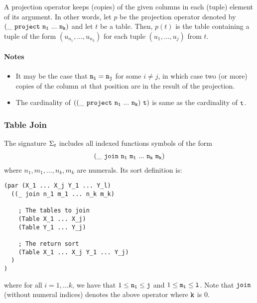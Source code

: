 \documentclass[english,a4paper,10pt]{article}
\begin{document}
A projection operator keeps (copies) of the given columns
in each (tuple) element of its argument.
In other words,
let $p$ be the projection operator denoted by ${\tt (\_\ project\ n_1\ ...\ n_k)}$
and let $t$ be a table.
Then, $p(t)$
is the table containing a tuple of the form
$(u_{n_1}, \ldots, u_{n_k})$
for each tuple $(u_1, \ldots, u_j)$ from $t$.

\paragraph{Notes}
\begin{itemize}
\item
It may be the case that ${\tt n_i} = {\tt n_j}$ for some $i \neq j$,
in which case two (or more) copies of the column at that position
are in the result of the projection.
\item
The cardinality of $\syntax{((\_\ project\ n_1\ ...\ n_k)\ t)}$ is
same as the cardinality of ${\tt t}$.
\end{itemize}

\subsubsection{Table Join}
The signature $\Sigma_{t}$ includes 
all indexed functions symbols of the form
\begin{align*}
{\tt  
(\_\ join\ n_1\ m_1\ ...\ n_k\ m_k)
}
\end{align*}
where $n_1, m_1, \ldots, n_k, m_k$ are numerals.
Its sort definition is:

\begin{verbatim}
(par (X_1 ... X_j Y_1 ... Y_l)
  ((_ join n_1 m_1 ... n_k m_k)
  
    ; The tables to join
    (Table X_1 ... X_j)
    (Table Y_1 ... Y_j)
    
    ; The return sort
    (Table X_1 ... X_j Y_1 ... Y_j)
  )
)
\end{verbatim}
where for all $i = 1, \ldots k$,
we have that $1 \leq {\tt n_1} \leq {\tt j}$ and $1 \leq {\tt m_i} \leq {\tt l}$. 
Note that
${\tt join}$ (without numeral indices) denotes the above operator where ${\tt k}$ is $0$.
\end{document}
